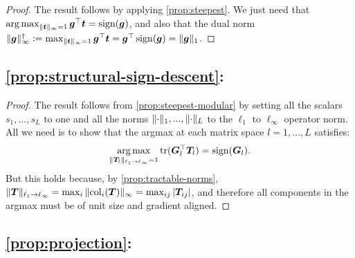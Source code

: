 \begin{proof}
The result follows by applying \cref{prop:steepest}. We just need that $\operatorname*{arg\,max}_{\Vert {{\bm{t}}} \Vert_\infty = 1} {\bm{g}}^\top {\bm{t}} = \operatorname{sign}({\bm{g}})$, and also that the dual norm $\Vert {{\bm{g}}} \Vert_\infty^\dagger \vcentcolon= \max_{\Vert {{\bm{t}}} \Vert_\infty = 1} {\bm{g}}^\top {\bm{t}} = {\bm{g}}^\top\operatorname{sign}({\bm{g}})= \Vert {{\bm{g}}} \Vert_1$.
\end{proof}




\subsection*{\cref{prop:structural-sign-descent}: } \label{proof:structural-sign-descent}

\begin{proof}
The result follows from \cref{prop:steepest-modular} by setting all the scalars $s_1,...,s_L$ to one and all the norms $\Vert {\cdot} \Vert_1, ..., \Vert {\cdot} \Vert_L$ to the $\ell_1$ to $\ell_\infty$ operator norm. All we need is to show that the argmax at each matrix space $l=1,...,L$ satisfies:
\begin{equation}
    \operatorname*{arg\,max}_{\Vert {{\bm{T}}_l} \Vert_{\ell_1 \to \ell_\infty} = 1} \operatorname{tr}({\bm{G}}_l^\top {\bm{T}}_l) = \operatorname{sign}({\bm{G}}_l).
\end{equation} 
But this holds because, by \cref{prop:tractable-norms}, $\Vert {{\bm{T}}} \Vert_{\ell_1 \to \ell_\infty} = \max_i \Vert {\mathrm{col}_i({\bm{T}})} \Vert_\infty = \max_{ij} \vert {{\bm{T}}_{ij}} \vert$, and therefore all components in the argmax must be of unit size and gradient aligned.
\end{proof}





\subsection*{\cref{prop:projection}: } \label{proof:projection}


